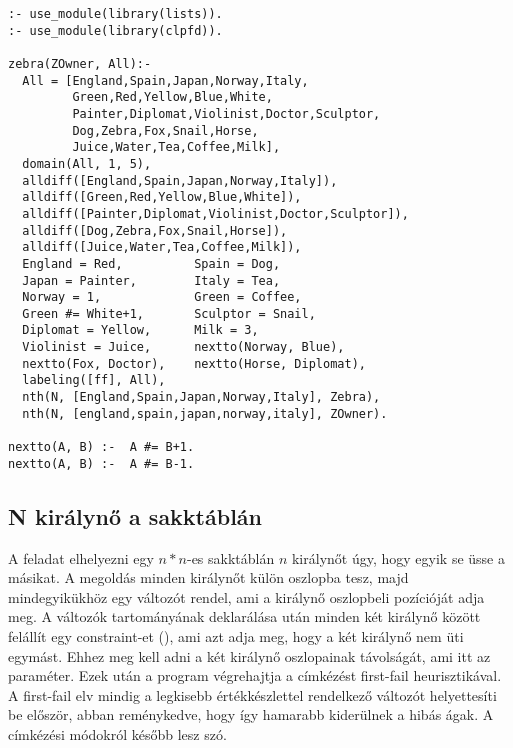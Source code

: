 \begin{verbatim}
:- use_module(library(lists)).
:- use_module(library(clpfd)).

zebra(ZOwner, All):-
  All = [England,Spain,Japan,Norway,Italy,
         Green,Red,Yellow,Blue,White,
         Painter,Diplomat,Violinist,Doctor,Sculptor,
         Dog,Zebra,Fox,Snail,Horse,
         Juice,Water,Tea,Coffee,Milk],
  domain(All, 1, 5),
  alldiff([England,Spain,Japan,Norway,Italy]),
  alldiff([Green,Red,Yellow,Blue,White]),
  alldiff([Painter,Diplomat,Violinist,Doctor,Sculptor]),
  alldiff([Dog,Zebra,Fox,Snail,Horse]),
  alldiff([Juice,Water,Tea,Coffee,Milk]),
  England = Red,          Spain = Dog,
  Japan = Painter,        Italy = Tea,
  Norway = 1,             Green = Coffee,
  Green #= White+1,       Sculptor = Snail,
  Diplomat = Yellow,      Milk = 3,
  Violinist = Juice,      nextto(Norway, Blue),
  nextto(Fox, Doctor),    nextto(Horse, Diplomat),
  labeling([ff], All),
  nth(N, [England,Spain,Japan,Norway,Italy], Zebra),
  nth(N, [england,spain,japan,norway,italy], ZOwner).

nextto(A, B) :-  A #= B+1.
nextto(A, B) :-  A #= B-1.
\end{verbatim}

\subsection{N királynő a sakktáblán}

A feladat elhelyezni egy $n * n$-es sakktáblán $n$ királynőt úgy, hogy
egyik se üsse a másikat.
\br
A megoldás minden királynőt külön oszlopba tesz, majd mindegyikükhöz
egy változót rendel, ami a királynő oszlopbeli pozícióját adja meg. A
változók tartományának deklarálása után minden két királynő között
felállít egy constraint-et (), ami azt adja meg, hogy
a két királynő nem üti egymást. Ehhez meg kell adni a két királynő
oszlopainak távolságát, ami itt az  paraméter. Ezek után a
program végrehajtja a címkézést first-fail heurisztikával. A first-fail
elv mindig a legkisebb értékkészlettel rendelkező változót helyettesíti
be először, abban reménykedve, hogy így hamarabb kiderülnek a hibás ágak.
A címkézési módokról később lesz szó.

\label{no:threat}

